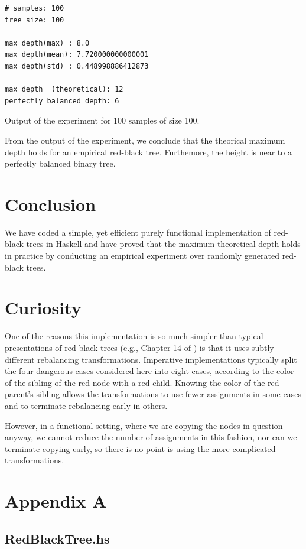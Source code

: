 \documentclass[12pt, a4paper]{article} %
\begin{document}
\begin{listing}[H]
  \begin{verbatim}
# samples: 100
tree size: 100

max depth(max) : 8.0
max depth(mean): 7.720000000000001
max depth(std) : 0.448998886412873

max depth  (theoretical): 12
perfectly balanced depth: 6
  \end{verbatim}
  \caption{Output of the experiment for 100 samples of size 100.}
  \label{lst:output}
\end{listing}

From the output of the experiment, we conclude that the theorical maximum depth holds for an empirical red-black tree. Furthemore, the height is near to a perfectly balanced binary tree.

\section{Conclusion}\label{s:conclusion}

We have coded a simple, yet efficient purely functional implementation of red-black trees in Haskell and have proved that the maximum theoretical depth holds in practice by conducting an empirical experiment over randomly generated red-black trees.

\section{Curiosity}\label{s:curiosity}

One of the reasons this implementation is so much  simpler than typical presentations of red-black trees (e.g., Chapter 14 of \cite{clr90}) is that it uses subtly different  rebalancing  transformations.  Imperative implementations typically split the four dangerous cases considered here into eight cases, according to the color  of the sibling  of the red node with a red child.  Knowing the color of the red parent's  sibling allows the transformations  to use fewer  assignments in some cases and to terminate rebalancing early in others.

However, in a functional setting, where we are copying the nodes in question  anyway, we cannot reduce the number  of assignments in this fashion, nor can we terminate copying early, so there is no point is using the more complicated transformations.


\newpage
\section*{Appendix A}\label{s:appendix-a}


\subsection*{RedBlackTree.hs}\label{s:redblacktree}

\inputminted{haskell}{../../Chapter3/RedBlackTree.hs}



\end{document}
